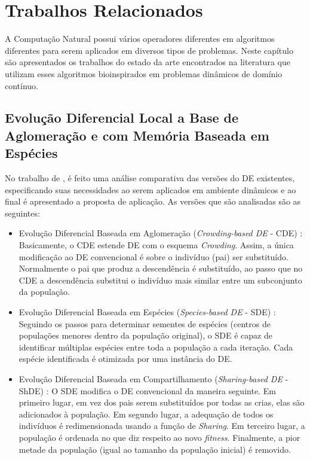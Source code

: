 \chapter{Trabalhos Relacionados}
\label{ch:relacionados}
A Computação Natural possui vários operadores diferentes em algoritmos diferentes para serem aplicados em diversos tipos de problemas. Neste capítulo são apresentados os trabalhos do estado da arte encontrados na literatura que utilizam esses algoritmos bioinspirados em problemas dinâmicos de domínio contínuo.

\section{Evolução Diferencial Local a Base de Aglomeração e com Memória Baseada em Espécies}
\label{sec:crowding_base_de}

No trabalho de \cite{kundu2013crowding}, é feito uma análise comparativa das versões do DE existentes, especificando suas necessidades ao serem aplicados em ambiente dinâmicos e ao final é apresentado a proposta de aplicação. As versões que são analisadas são as seguintes:

\begin{itemize}
\item Evolução Diferencial Baseada em Aglomeração (\textit{Crowding-based DE} - CDE) \cite{thomsen2004multimodal}: Basicamente, o CDE estende DE com o esquema \textit{Crowding}. Assim, a única modificação ao DE convencional é sobre o indivíduo (pai) ser substituído. Normalmente o pai que produz a descendência é substituído, ao passo que no CDE a descendência substitui o indivíduo mais similar entre um subconjunto da população.

\item Evolução Diferencial Baseada em Espécies (\textit{Species-based DE} - SDE) \cite{li2005efficient}: Seguindo os passos para determinar sementes de espécies (centros de populações menores dentro da população original), o SDE é capaz de identificar múltiplas espécies entre toda a população a cada iteração. Cada espécie identificada é otimizada por uma instância do DE.

\item Evolução Diferencial Baseada em Compartilhamento (\textit{Sharing-based DE} - ShDE) \cite{thomsen2004multimodal}: O SDE modifica o DE convencional da maneira seguinte. Em primeiro lugar, em vez dos pais serem substituídos por todas as crias, elas são adicionados à população. Em segundo lugar, a adequação de todos os indivíduos é redimensionada usando a função de \textit{Sharing}. Em terceiro lugar, a população é ordenada no que diz respeito ao novo \textit{fitness}. Finalmente, a pior metade da população (igual ao tamanho da população inicial) é removido.
\end{itemize}

